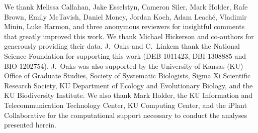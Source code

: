 We thank Melissa Callahan, Jake Esselstyn, Cameron Siler, Mark Holder, Rafe
Brown, Emily McTavish, Daniel Money, Jordan Koch, Adam Leach\'{e}, Vladimir
Minin, Luke Harmon, and three anonymous reviewers for insightful comments that
greatly improved this work.
We thank Michael Hickerson and co-authors for generously providing their data.
J.\ Oaks and C.\ Linkem thank the National Science Foundation for supporting
this work (DEB 1011423, DBI 1308885 and BIO-1202754).
J.\ Oaks was also supported by the University of Kansas (KU) Office of Graduate
Studies, Society of Systematic Biologists, Sigma Xi Scientific Research
Society, KU Department of Ecology and Evolutionary Biology, and the KU
Biodiversity Institute.
We also thank Mark Holder, the KU Information and Telecommunication Technology
Center, KU Computing Center, and the iPlant Collaborative for the computational
support necessary to conduct the analyses presented herein.
